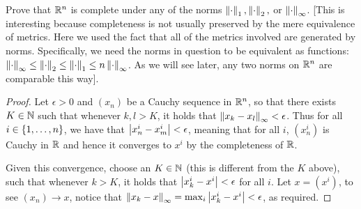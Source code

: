 \begin{exercise}{16}
Prove that $\mathbb{R}^n$ is complete under any of the norms $\left\lVert \cdot\right\rVert_1, \left\lVert \cdot\right\rVert_2,$ or $\left\lVert \cdot\right\rVert_\infty$.
[This is interesting because completeness is not usually preserved by the mere equivalence of metrics.
Here we used the fact that all of the metrics involved are generated by norms.
Specifically, we need the norms in question to be equivalent as functions:
$\left\lVert \cdot\right\rVert_\infty \leq \left\lVert \cdot\right\rVert_2 \leq \left\lVert \cdot\right\rVert_1 \leq n\left\lVert \cdot\right\rVert_\infty$.
As we will see later, any two norms on $\mathbb{R}^n$ are comparable this way].
\end{exercise}
\begin{proof}
Let $\epsilon>0$ and $(x_n)$ be a Cauchy sequence in $\mathbb{R}^n$, so that there exists $K\in\mathbb{N}$ such that whenever $k,l>K$, it holds that $\left\lVert x_k-x_l\right\rVert_\infty < \epsilon$.
Thus for all $i\in \{1,\dots,n\}$, we have that $\left\lvert x_n^i-x_m^i\right\rvert<\epsilon$, meaning that for all $i$, $(x^i_n)$ is Cauchy in $\mathbb{R}$ and hence it converges to $x^i$ by the completeness of $\mathbb{R}$.

Given this convergence, choose an $K\in\mathbb{N}$ (this is different from the $K$ above), such that whenever $k>K$, it holds that $\left\lvert x^i_k-x^i\right\rvert<\epsilon$ for all $i$.
Let $x=(x^i)$, to see $(x_n)\to x$, notice that $\left\lVert x_k-x\right\rVert_\infty = \max_i\left\lvert x_k^i-x^i\right\rvert < \epsilon$, as required.
\end{proof} 

